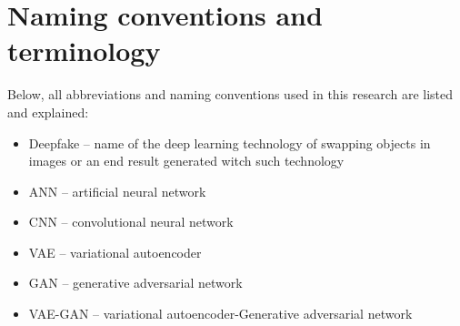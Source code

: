 \section{Naming conventions and terminology}
Below, all abbreviations and naming conventions used in this research are listed and explained:

\begin{itemize}
\item Deepfake -- name of the deep learning technology of swapping objects in images or an end result generated witch such technology
\item ANN -- artificial neural network
\item CNN -- convolutional neural network
\item VAE -- variational autoencoder 
\item GAN -- generative adversarial network
\item VAE-GAN -- variational autoencoder-Generative adversarial network 
\end{itemize}